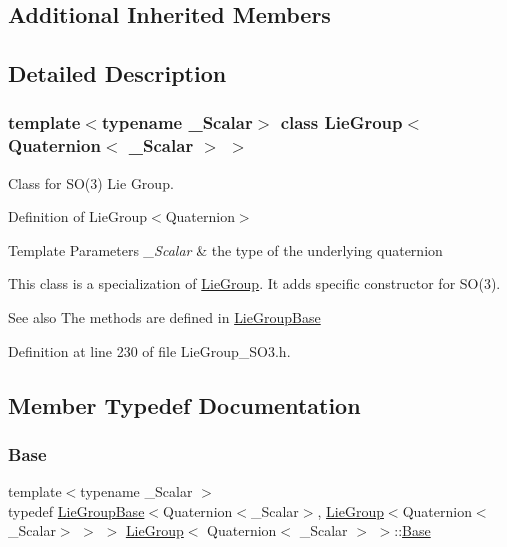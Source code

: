 \subsection*{Additional Inherited Members}


\subsection{Detailed Description}
\subsubsection*{template$<$typename \+\_\+\+Scalar$>$\newline
class Lie\+Group$<$ Quaternion$<$ \+\_\+\+Scalar $>$ $>$}

Class for S\+O(3) Lie Group. 

Definition of Lie\+Group$<$\+Quaternion$>$


\begin{DoxyTemplParams}{Template Parameters}
{\em \+\_\+\+Scalar} & the type of the underlying quaternion\\
\hline
\end{DoxyTemplParams}
This class is a specialization of \hyperlink{class_lie_group}{Lie\+Group}. It adds specific constructor for S\+O(3).

\begin{DoxySeeAlso}{See also}
The methods are defined in \hyperlink{class_lie_group_base}{Lie\+Group\+Base} 
\end{DoxySeeAlso}


Definition at line 230 of file Lie\+Group\+\_\+\+S\+O3.\+h.



\subsection{Member Typedef Documentation}
\hypertarget{class_lie_group_3_01_quaternion_3_01___scalar_01_4_01_4_a08877e48ca8072baeeed20cedb358b8c}{}\label{class_lie_group_3_01_quaternion_3_01___scalar_01_4_01_4_a08877e48ca8072baeeed20cedb358b8c} 
\subsubsection{\texorpdfstring{Base}{Base}}
{\footnotesize\ttfamily template$<$typename \+\_\+\+Scalar $>$ \\
typedef \hyperlink{class_lie_group_base}{Lie\+Group\+Base}$<$Quaternion$<$\+\_\+\+Scalar$>$, \hyperlink{class_lie_group}{Lie\+Group}$<$Quaternion$<$\+\_\+\+Scalar$>$ $>$ $>$ \hyperlink{class_lie_group}{Lie\+Group}$<$ Quaternion$<$ \+\_\+\+Scalar $>$ $>$\+::\hyperlink{class_lie_group_3_01_quaternion_3_01___scalar_01_4_01_4_a08877e48ca8072baeeed20cedb358b8c}{Base}\hspace{0.3cm}{\ttfamily [protected]}}

